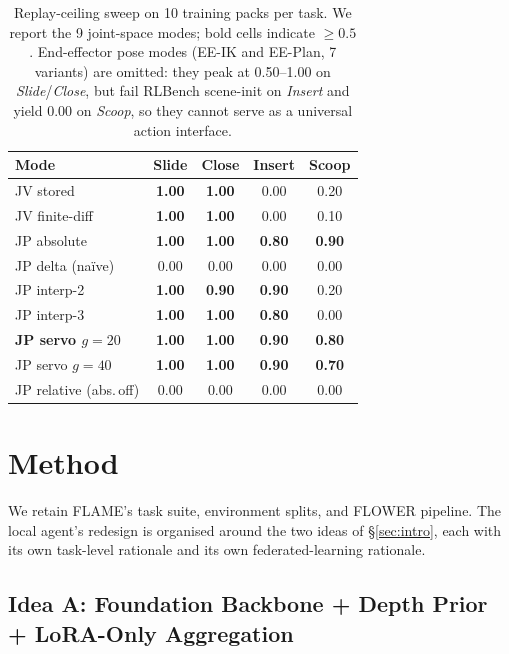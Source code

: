 \documentclass{article}
\begin{document}
\begin{table}[h]
\centering
\footnotesize
\caption{Replay-ceiling sweep on 10 training packs per task. We
report the 9 joint-space modes; bold cells indicate $\geq\!0.5$.
End-effector pose modes (EE-IK and EE-Plan, 7 variants) are
omitted: they peak at 0.50--1.00 on \emph{Slide}/\emph{Close}, but
fail RLBench scene-init on \emph{Insert} and yield 0.00 on
\emph{Scoop}, so they cannot serve as a universal action interface.}
\label{tab:ceiling}
\begin{tabular}{lcccc}
\toprule
Mode & Slide & Close & Insert & Scoop\\
\midrule
JV stored                    & \textbf{1.00} & \textbf{1.00} & 0.00          & 0.20\\
JV finite-diff               & \textbf{1.00} & \textbf{1.00} & 0.00          & 0.10\\
JP absolute                  & \textbf{1.00} & \textbf{1.00} & \textbf{0.80} & \textbf{0.90}\\
JP delta (na\"ive)           & 0.00          & 0.00          & 0.00          & 0.00\\
JP interp-2                  & \textbf{1.00} & \textbf{0.90} & \textbf{0.90} & 0.20\\
JP interp-3                  & \textbf{1.00} & \textbf{1.00} & \textbf{0.80} & 0.00\\
\textbf{JP servo $g\!=\!20$} & \textbf{1.00} & \textbf{1.00} & \textbf{0.90} & \textbf{0.80}\\
JP servo $g\!=\!40$          & \textbf{1.00} & \textbf{1.00} & \textbf{0.90} & \textbf{0.70}\\
JP relative (abs.\,off)      & 0.00          & 0.00          & 0.00          & 0.00\\
\bottomrule
\end{tabular}
\end{table}

\section{Method}
\label{sec:method}

We retain FLAME's task suite, environment splits, and FLOWER
pipeline. The local agent's redesign is organised around the two
ideas of \S\ref{sec:intro}, each with its own task-level rationale
and its own federated-learning rationale.

\subsection{Idea A: Foundation Backbone + Depth Prior + LoRA-Only Aggregation}
\label{sec:idea-a}
\end{document}
